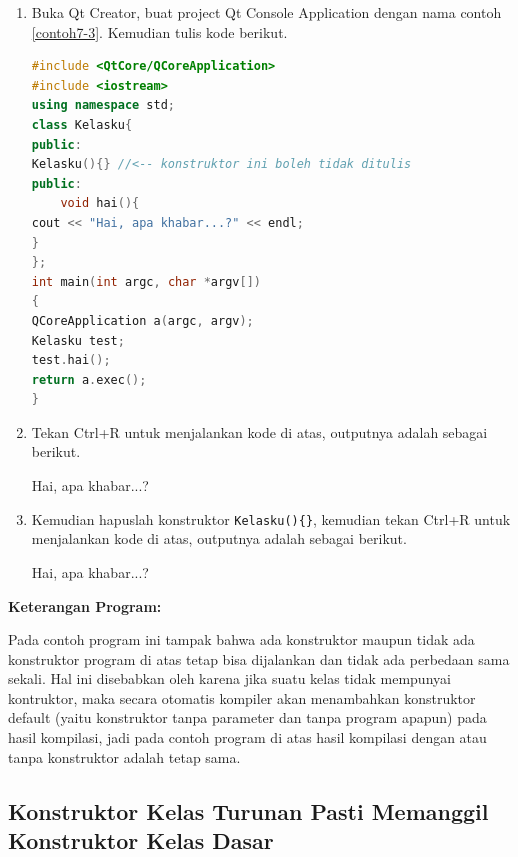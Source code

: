 \begin{enumerate}

\item
  Buka Qt Creator, buat project Qt Console Application dengan nama
  contoh \ref{contoh7-3}. Kemudian tulis kode berikut.

\begin{lstlisting}[language=c++, caption=Konstruktor default, label=contoh7-3]
#include <QtCore/QCoreApplication>
#include <iostream>
using namespace std;
class Kelasku{
public:
Kelasku(){} //<-- konstruktor ini boleh tidak ditulis
public:
    void hai(){
cout << "Hai, apa khabar...?" << endl;
}
};
int main(int argc, char *argv[])
{
QCoreApplication a(argc, argv);
Kelasku test;
test.hai();
return a.exec();
}
\end{lstlisting}
\item
  Tekan Ctrl+R untuk menjalankan kode di atas, outputnya adalah sebagai
  berikut.

\begin{lcverbatim}
Hai, apa khabar...?
\end{lcverbatim}



\item
  Kemudian hapuslah konstruktor \texttt{Kelasku()\{\}}, kemudian tekan
  Ctrl+R untuk menjalankan kode di atas, outputnya adalah sebagai
  berikut.
  \begin{lcverbatim}
Hai, apa khabar...?
  \end{lcverbatim}
\end{enumerate}



\textbf{Keterangan Program:}

Pada contoh program ini tampak bahwa ada konstruktor maupun tidak ada
konstruktor program di atas tetap bisa dijalankan dan tidak ada
perbedaan sama sekali. Hal ini disebabkan oleh karena jika suatu kelas
tidak mempunyai kontruktor, maka secara otomatis kompiler akan
menambahkan konstruktor default (yaitu konstruktor tanpa parameter dan
tanpa program apapun) pada hasil kompilasi, jadi pada contoh program di
atas hasil kompilasi dengan atau tanpa konstruktor adalah tetap sama.

\subsection{Konstruktor Kelas Turunan Pasti Memanggil Konstruktor Kelas Dasar}\label{konstruktor-kelas-turunan-pasti-memanggil-konstruktor-kelas-dasar}

